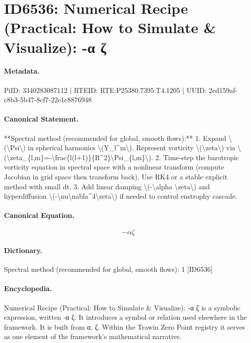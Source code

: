 \section*{ID6536: Numerical Recipe (Practical: How to Simulate \& Visualize): -α ζ}
\paragraph{Metadata.}
PiID: 3340283087112 | RTEID: RTE:P25380.7395:T4.1205 | UUID: 2ed159af-c8b3-5b47-8cf7-22e1c8876948

\paragraph{Canonical Statement.}
**Spectral method (recommended for global, smooth flows):** 1. Expand \textbackslash{}(\textbackslash{}Psi\textbackslash{}) in spherical harmonics \textbackslash{}(Y\_l\textasciicircum{}m\textbackslash{}). Represent vorticity \textbackslash{}(\textbackslash{}zeta\textbackslash{}) via \textbackslash{}(\textbackslash{}zeta\_\{l,m\}=-\textbackslash{}frac\{l(l+1)\}\{R\textasciicircum{}2\}\textbackslash{}Psi\_\{l,m\}\textbackslash{}). 2. Time-step the barotropic vorticity equation in spectral space with a nonlinear transform (compute Jacobian in grid space then transform back). Use RK4 or a stable explicit method with small dt. 3. Add linear damping \textbackslash{}(-\textbackslash{}alpha \textbackslash{}zeta\textbackslash{}) and hyperdiffusion \textbackslash{}(-\textbackslash{}nu\textbackslash{}nabla\textasciicircum{}4\textbackslash{}zeta\textbackslash{}) if needed to control enstrophy cascade.

\paragraph{Canonical Equation.}
\[
-\alpha \zeta
\]

\paragraph{Dictionary.}
Spectral method (recommended for global, smooth flows): 1 [ID6536]

\paragraph{Encyclopedia.}
Numerical Recipe (Practical: How to Simulate \& Visualize): -α ζ is a symbolic expression, written -α ζ. It introduces a symbol or relation used elsewhere in the framework. It is built from α, ζ. Within the Trawin Zero Point registry it serves as one element of the framework's mathematical narrative.
